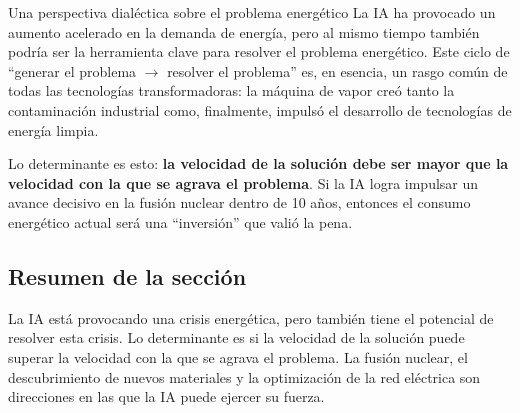 \begin{importantbox}{Una perspectiva dialéctica sobre el problema energético}
La IA ha provocado un aumento acelerado en la demanda de energía, pero al mismo tiempo también podría ser la herramienta clave para resolver el problema energético. Este ciclo de ``generar el problema $\to$ resolver el problema'' es, en esencia, un rasgo común de todas las tecnologías transformadoras: la máquina de vapor creó tanto la contaminación industrial como, finalmente, impulsó el desarrollo de tecnologías de energía limpia.

Lo determinante es esto: \textbf{la velocidad de la solución debe ser mayor que la velocidad con la que se agrava el problema}. Si la IA logra impulsar un avance decisivo en la fusión nuclear dentro de 10 años, entonces el consumo energético actual será una ``inversión'' que valió la pena.
\end{importantbox}

\subsection{Resumen de la sección}

La IA está provocando una crisis energética, pero también tiene el potencial de resolver esta crisis. Lo determinante es si la velocidad de la solución puede superar la velocidad con la que se agrava el problema. La fusión nuclear, el descubrimiento de nuevos materiales y la optimización de la red eléctrica son direcciones en las que la IA puede ejercer su fuerza.

